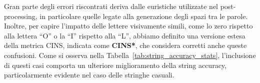 Gran parte degli errori riscontrati deriva dalle euristiche utilizzate nel post-processing, in particolare quelle legate alla generazione degli spazi tra le parole.  
Inoltre, per capire l'impatto delle lettere visivamente simili, come lo zero rispetto alla lettera “O” o la “I” rispetto alla “L”, abbiamo definito una versione estesa della metrica CINS, indicata come \textbf{CINS*}, che considera corretti anche queste confusioni.  
Come si osserva nella Tabella~\ref{tab:string_accuracy_stats}, l'inclusione di questi casi comporta un ulteriore miglioramento della string accuracy, particolarmente evidente nel caso delle stringhe casuali.